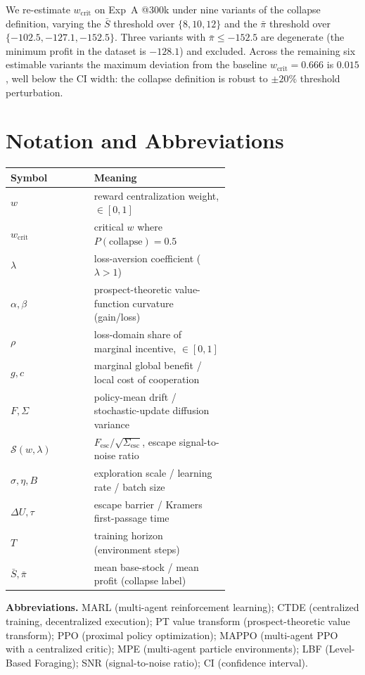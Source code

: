 \documentclass[letterpaper]{article} %
\theoremstyle{plain}
\newcommand{\wcrit}{w_{\mathrm{crit}}}
\begin{document}
We re-estimate $\wcrit$ on Exp~A @300k under nine variants of the collapse definition, varying
the $\bar S$ threshold over $\{8,10,12\}$ and the $\bar\pi$ threshold over
$\{-102.5,-127.1,-152.5\}$. Three variants with $\bar\pi\le-152.5$ are degenerate (the minimum
profit in the dataset is $-128.1$) and excluded. Across the remaining six estimable variants
the maximum deviation from the baseline $\wcrit=0.666$ is $0.015$, well below the CI width: the
collapse definition is robust to $\pm20\%$ threshold perturbation.

\section{Notation and Abbreviations}
\label{sec:s_notation}

\begin{table}[h]
\centering \small
\begin{tabular}{lp{0.62\linewidth}}
\toprule
Symbol & Meaning \\
\midrule
$w$ & reward centralization weight, $\in[0,1]$ \\
$\wcrit$ & critical $w$ where $P(\mathrm{collapse}){=}0.5$ \\
$\lambda$ & loss-aversion coefficient ($\lambda{>}1$) \\
$\alpha,\beta$ & prospect-theoretic value-function curvature (gain/loss) \\
$\rho$ & loss-domain share of marginal incentive, $\in[0,1]$ \\
$g,c$ & marginal global benefit / local cost of cooperation \\
$F,\Sigma$ & policy-mean drift / stochastic-update diffusion variance \\
$\mathcal{S}(w,\lambda)$ & $F_{\mathrm{esc}}/\sqrt{\Sigma_{\mathrm{esc}}}$, escape signal-to-noise ratio \\
$\sigma,\eta,B$ & exploration scale / learning rate / batch size \\
$\Delta U,\tau$ & escape barrier / Kramers first-passage time \\
$T$ & training horizon (environment steps) \\
$\bar S,\bar\pi$ & mean base-stock / mean profit (collapse label) \\
\bottomrule
\end{tabular}
\end{table}

\noindent\textbf{Abbreviations.} MARL (multi-agent reinforcement learning); CTDE (centralized
training, decentralized execution); PT value transform (prospect-theoretic value transform); PPO (proximal policy
optimization); MAPPO (multi-agent PPO with a centralized critic); MPE (multi-agent particle
environments); LBF (Level-Based Foraging); SNR (signal-to-noise ratio); CI (confidence
interval).
\end{document}
